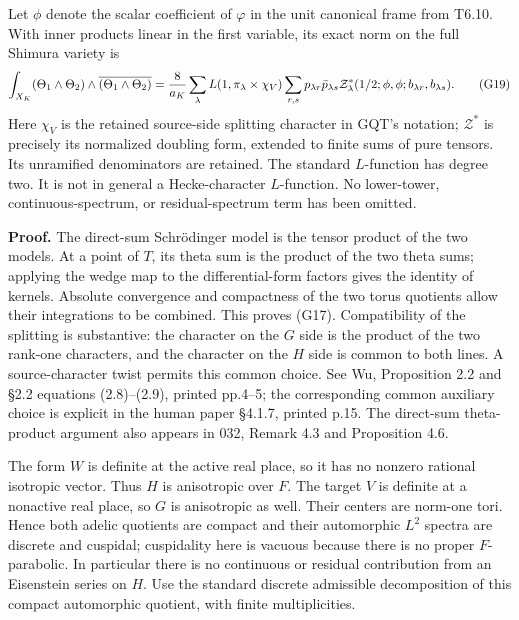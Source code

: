 \documentclass[11pt,a4paper]{article}
\theoremstyle{definition}
\begin{document}
Let \(\phi\) denote the scalar coefficient of \(\varphi\) in the unit canonical frame from T6.10. With inner products linear in the first variable, its exact norm on the full Shimura variety is \[
\int_{X_K}(\Theta_1\wedge\Theta_2)\wedge
                 \overline{(\Theta_1\wedge\Theta_2)}
={8\over a_K}\sum_\lambda L(1,\pi_\lambda\times\chi_V)
\sum_{r,s}p_{\lambda r}\bar p_{\lambda s}
\mathcal Z^*_{\lambda}(1/2;\phi,\phi;b_{\lambda r},b_{\lambda s}).
\tag{G19}
\] Here \(\chi_V\) is the retained source-side splitting character in GQT's notation; \(\mathcal Z^*\) is precisely its normalized doubling form, extended to finite sums of pure tensors. Its unramified denominators are retained. The standard \(L\)-function has degree two. It is not in general a Hecke-character \(L\)-function. No lower-tower, continuous-spectrum, or residual-spectrum term has been omitted.

\textbf{Proof.} The direct-sum Schrödinger model is the tensor product of the two models. At a point of \(T\), its theta sum is the product of the two theta sums; applying the wedge map to the differential-form factors gives the identity of kernels. Absolute convergence and compactness of the two torus quotients allow their integrations to be combined. This proves (G17). Compatibility of the splitting is substantive: the character on the \(G\) side is the product of the two rank-one characters, and the character on the \(H\) side is common to both lines. A source-character twist permits this common choice. See Wu, Proposition 2.2 and §2.2 equations (2.8)--(2.9), printed pp.4--5; the corresponding common auxiliary choice is explicit in the human paper §4.1.7, printed p.15. The direct-sum theta-product argument also appears in 032, Remark 4.3 and Proposition 4.6.

The form \(W\) is definite at the active real place, so it has no nonzero rational isotropic vector. Thus \(H\) is anisotropic over \(F\). The target \(V\) is definite at a nonactive real place, so \(G\) is anisotropic as well. Their centers are norm-one tori. Hence both adelic quotients are compact and their automorphic \(L^2\) spectra are discrete and cuspidal; cuspidality here is vacuous because there is no proper \(F\)-parabolic. In particular there is no continuous or residual contribution from an Eisenstein series on \(H\). Use the standard discrete admissible decomposition of this compact automorphic quotient, with finite multiplicities.
\end{document}
